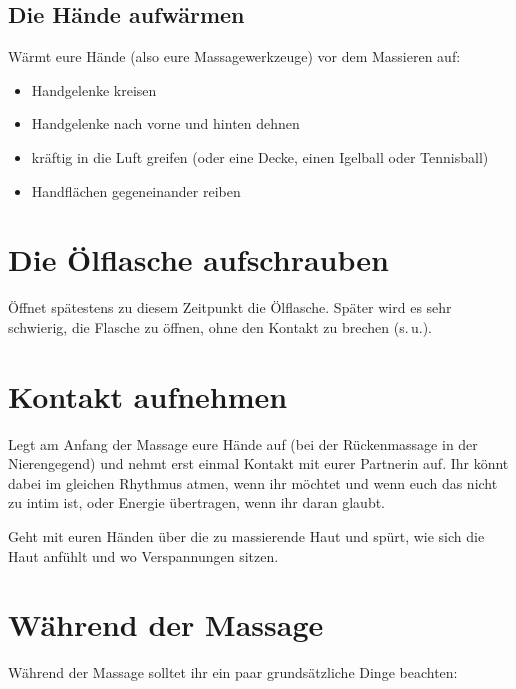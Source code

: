 \subsection{Die Hände aufwärmen}

Wärmt eure Hände (also eure Massagewerkzeuge) vor dem Massieren auf:

\begin{itemize}
  \item Handgelenke kreisen
  \item Handgelenke nach vorne und hinten dehnen
  \item kräftig in die Luft greifen (oder eine Decke, einen Igelball oder Tennisball)
  \item Handflächen gegeneinander reiben
\end{itemize}


\section{Die Ölflasche aufschrauben}

Öffnet spätestens zu diesem Zeitpunkt die Ölflasche. Später wird es sehr schwierig, die Flasche zu öffnen, ohne den Kontakt zu brechen (s.\,u.).

\section{Kontakt aufnehmen}

Legt am Anfang der Massage eure Hände auf (bei der Rückenmassage in der Nierengegend) und nehmt erst einmal Kontakt mit eurer Partnerin auf. Ihr könnt dabei im gleichen Rhythmus atmen, wenn ihr möchtet und wenn euch das nicht zu intim ist, oder Energie übertragen, wenn ihr daran glaubt.

Geht mit euren Händen über die zu massierende Haut und spürt, wie sich die Haut anfühlt und wo Verspannungen sitzen.


\section{Während der Massage}

Während der Massage solltet ihr ein paar grundsätzliche Dinge beachten:

